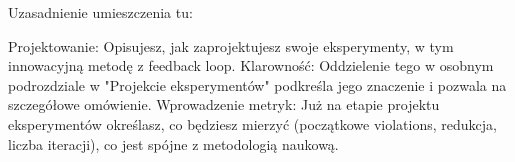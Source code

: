 Uzasadnienie umieszczenia tu:

Projektowanie: Opisujesz, jak zaprojektujesz swoje eksperymenty, w tym innowacyjną metodę z feedback loop.
Klarowność: Oddzielenie tego w osobnym podrozdziale w "Projekcie eksperymentów" podkreśla jego znaczenie i pozwala na szczegółowe omówienie.
Wprowadzenie metryk: Już na etapie projektu eksperymentów określasz, co będziesz mierzyć (początkowe violations, redukcja, liczba iteracji), co jest spójne z metodologią naukową.